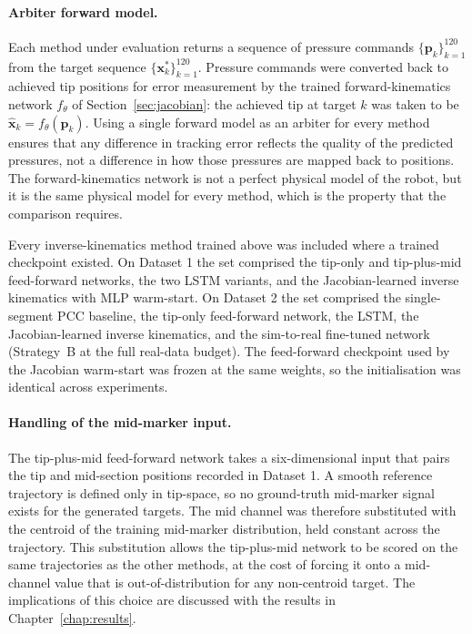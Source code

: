 \paragraph{Arbiter forward model.}
Each method under evaluation returns a sequence of pressure commands $\{\mathbf{p}_k\}_{k=1}^{120}$ from the target sequence $\{\mathbf{x}^{*}_k\}_{k=1}^{120}$. Pressure commands were converted back to achieved tip positions for error measurement by the trained forward-kinematics network $f_{\theta}$ of Section~\ref{sec:jacobian}: the achieved tip at target $k$ was taken to be $\hat{\mathbf{x}}_k = f_{\theta}(\mathbf{p}_k)$. Using a single forward model as an arbiter for every method ensures that any difference in tracking error reflects the quality of the predicted pressures, not a difference in how those pressures are mapped back to positions. The forward-kinematics network is not a perfect physical model of the robot, but it is the same physical model for every method, which is the property that the comparison requires.

Every inverse-kinematics method trained above was included where a trained checkpoint existed. On Dataset 1 the set comprised the tip-only and tip-plus-mid feed-forward networks, the two LSTM variants, and the Jacobian-learned inverse kinematics with MLP warm-start. On Dataset 2 the set comprised the single-segment PCC baseline, the tip-only feed-forward network, the LSTM, the Jacobian-learned inverse kinematics, and the sim-to-real fine-tuned network (Strategy~B at the full real-data budget). The feed-forward checkpoint used by the Jacobian warm-start was frozen at the same weights, so the initialisation was identical across experiments.

\paragraph{Handling of the mid-marker input.}
The tip-plus-mid feed-forward network takes a six-dimensional input that pairs the tip and mid-section positions recorded in Dataset 1. A smooth reference trajectory is defined only in tip-space, so no ground-truth mid-marker signal exists for the generated targets. The mid channel was therefore substituted with the centroid of the training mid-marker distribution, held constant across the trajectory. This substitution allows the tip-plus-mid network to be scored on the same trajectories as the other methods, at the cost of forcing it onto a mid-channel value that is out-of-distribution for any non-centroid target. The implications of this choice are discussed with the results in Chapter~\ref{chap:results}.

